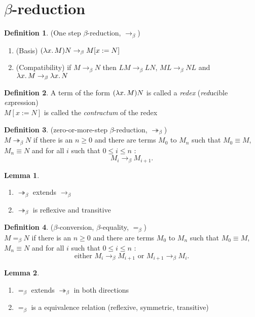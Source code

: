 \documentclass[a4paper]{book}
\theoremstyle{definition}
\newtheorem{definition}{Definition}[section]
\newtheorem{lemma}{Lemma}[section]
\newcommand{\bred}{\(\beta\)-reduction}
\newcommand{\bconv}{\(\beta\)-conversion}
\newcommand{\beq}{=_\beta}
\newcommand{\obr}{\rightarrow_\beta}
\newcommand{\mbr}{\twoheadrightarrow_\beta}
\begin{document}
\section{\(\beta\)-reduction}
\begin{definition}
  (One step \(\beta\)-reduction, \(\rightarrow_\beta\))
  \begin{enumerate}
    \item (Basis) \((\lambda x\ldotp M) N \obr M[x := N]\)
    \item (Compatibility) if  \(M \obr N\) then \(L M \obr L N\), \(M L \obr N L\) and \(\lambda x\ldotp M \obr \lambda x\ldotp N\)
  \end{enumerate}
\end{definition}
\begin{definition}
  A term of the form \((\lambda x\ldotp M) N\) is called a \textit{redex} (\textit{red}ucible \textit{ex}pression)\\
  \(M[x := N]\) is called the \textit{contractum} of the redex
\end{definition}
\begin{definition}
  (zero-or-more-step \bred, \(\mbr\))\\
  \(M \mbr N\) if there is an \(n \geq 0\) and there are terms
  \(M_0\) to \(M_n\) such that \(M_0 \equiv M\), \(M_n \equiv N\)
  and for all \(i\) such that \(0 \leq i \leq n\) : \[
    M_i \obr M_{i+1}
    .\]
\end{definition}
\begin{lemma}
  \begin{enumerate}
    \item \(\mbr\) extends \(\obr\)
    \item \(\mbr\) is reflexive and transitive
  \end{enumerate}
\end{lemma}
\begin{definition}
  (\bconv, \(\beta\)-equality, \(\beq\))\\
  \(M \beq N\) if there is an \(n \geq  0\) and there are terms
  \(M_0\) to \(M_n\) such that \(M_0 \equiv M\), \(M_n \equiv N\)
  and for all \(i\) such that \(0 \leq i \leq n\) : \[
    \text{either }M_i \obr M_{i+1}\text{ or }M_{i+1} \obr M_i
    .\]
\end{definition}
\begin{lemma}
  \begin{enumerate}
    \item \(\beq\) extends \(\mbr\) in both directions
    \item \(\beq\) is a equivalence relation (reflexive,
          symmetric, transitive)
  \end{enumerate}
\end{lemma}
\end{document}

